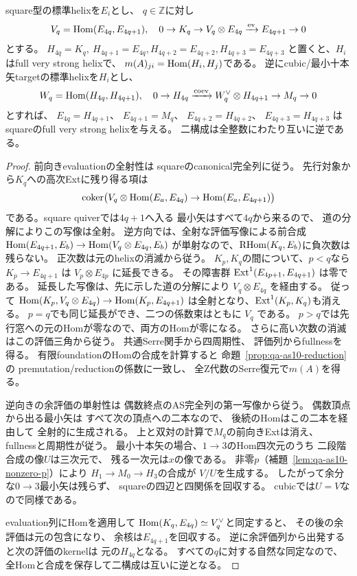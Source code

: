 \begin{lemma}[全整数での評価と余評価の互逆性]
\label{lem:qa-as10-all-index-mutual-inverse}
square型の標準helixを$E_i$とし、
$q\in\mathbb Z$に対し
\[
V_q=\operatorname{Hom}(E_{4q},E_{4q+1}),\quad
0\to K_q\to V_q\otimes E_{4q}
 \xrightarrow{\mathrm{ev}}E_{4q+1}\to0
\]
とする。
$H_{4q}=K_q,\ H_{4q+1}=E_{4q},
H_{4q+2}=E_{4q+2},H_{4q+3}=E_{4q+3}$
と置くと、$H_i$はfull very strong helixで、
$m(A)_{ji}=\operatorname{Hom}(H_i,H_j)$である。
逆にcubic/最小十本矢targetの標準helixを$H_i$とし、
\[
W_q=\operatorname{Hom}(H_{4q},H_{4q+1}),\quad
0\to H_{4q}\xrightarrow{\mathrm{coev}}
 W_q^\vee\otimes H_{4q+1}\to M_q\to0
\]
とすれば、
$E_{4q}=H_{4q+1}$、
$E_{4q+1}=M_q$、
$E_{4q+2}=H_{4q+2}$、
$E_{4q+3}=H_{4q+3}$
はsquareのfull very strong helixを与える。
二構成は全整数にわたり互いに逆である。
\end{lemma}
\begin{proof}
前向きevaluationの全射性は
squareのcanonical完全列に従う。
先行対象から$K_q$への高次Extに残り得る項は
\[
\operatorname{coker}\bigl(
 V_q\otimes\operatorname{Hom}(E_a,E_{4q})
 \to\operatorname{Hom}(E_a,E_{4q+1})\bigr)
\]
である。square quiverでは$4q+1$へ入る
最小矢はすべて$4q$から来るので、
道の分解によりこの写像は全射。
逆方向では、全射な評価写像による前合成
$\operatorname{Hom}(E_{4q+1},E_b)\to\operatorname{Hom}(V_q\otimes E_{4q},E_b)$
が単射なので、$\operatorname{RHom}(K_q,E_b)$に負次数は残らない。
正次数は元のhelixの消滅から従う。
$K_p,K_q$の間について、$p<q$なら
$K_p\to E_{4q+1}$ は $V_p\otimes E_{4p}$ に延長できる。
その障害群 $\operatorname{Ext}^1(E_{4p+1},E_{4q+1})$ は零である。
延長した写像は、先に示した道の分解により
$V_q\otimes E_{4q}$ を経由する。
従って $\operatorname{Hom}(K_p,V_q\otimes E_{4q})\to\operatorname{Hom}(K_p,E_{4q+1})$
は全射となり、$\operatorname{Ext}^1(K_p,K_q)$も消える。
$p=q$でも同じ延長ができ、二つの係数束はともに $V_q$ である。
$p>q$では先行窓への元のHomが零なので、両方のHomが零になる。
さらに高い次数の消滅はこの評価三角から従う。
共通Serre関手から四周期性、
評価列からfullnessを得る。
有限foundationのHomの合成を計算すると
命題~\ref{prop:qa-as10-reduction}の
premutation/reductionの係数に一致し、
全Z代数のSerre復元で$m(A)$を得る。

逆向きの余評価の単射性は
偶数終点のAS完全列の第一写像から従う。
偶数頂点から出る最小矢は
すべて次の頂点への二本なので、
後続のHomはこの二本を経由して
全射的に生成される。
上と双対の計算で$M_q$の前向きExtは消え、
fullnessと周期性が従う。
最小十本矢の場合、$1\to3$のHom四次元のうち
二段階合成の像$U$は三次元で、
残る一次元は$x$の像である。
非零$p$（補題~\ref{lem:qa-as10-nonzero-p}）により
$H_1\to M_0\to H_3$の合成が
$V/U$を生成する。
したがって余分な$0\to3$最小矢は残らず、
squareの四辺と四関係を回収する。
cubicでは$U=V$なので同様である。

evaluation列にHomを適用して
$\operatorname{Hom}(K_q,E_{4q})\simeq V_q^\vee$と同定すると、
その後の余評価は元の包含になり、
余核は$E_{4q+1}$を回収する。
逆に余評価列から出発すると次の評価のkernelは
元の$H_{4q}$となる。
すべての$q$に対する自然な同定なので、
全Homと合成を保存して二構成は互いに逆となる。
\end{proof}

